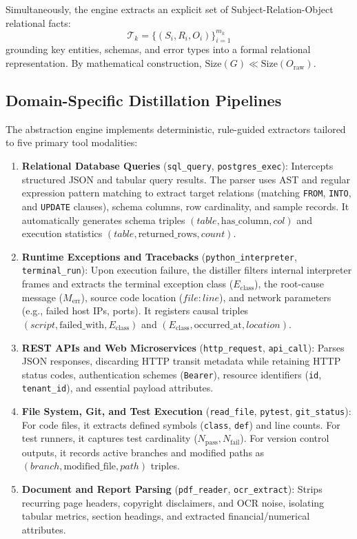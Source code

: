 \documentclass[lettersize,journal]{IEEEtran}
\begin{document}
Simultaneously, the engine extracts an explicit set of Subject-Relation-Object relational facts:
\begin{equation}
\label{eq:triples}
\mathcal{T}_k = \{(S_i, R_i, O_i)\}_{i=1}^{m_k}
\end{equation}
grounding key entities, schemas, and error types into a formal relational representation. By mathematical construction, $\text{Size}(G) \ll \text{Size}(O_{\text{raw}})$.

\subsection{Domain-Specific Distillation Pipelines}

The abstraction engine implements deterministic, rule-guided extractors tailored to five primary tool modalities:

\begin{enumerate}
    \item \textbf{Relational Database Queries} (\texttt{sql\_query}, \texttt{postgres\_exec}): Intercepts structured JSON and tabular query results. The parser uses AST and regular expression pattern matching to extract target relations (matching \texttt{FROM}, \texttt{INTO}, and \texttt{UPDATE} clauses), schema columns, row cardinality, and sample records. It automatically generates schema triples $(table, \text{has\_column}, col)$ and execution statistics $(table, \text{returned\_rows}, count)$.
    \item \textbf{Runtime Exceptions and Tracebacks} (\texttt{python\_interpreter}, \texttt{terminal\_run}): Upon execution failure, the distiller filters internal interpreter frames and extracts the terminal exception class ($E_{\text{class}}$), the root-cause message ($M_{\text{err}}$), source code location ($file:line$), and network parameters (e.g., failed host IPs, ports). It registers causal triples $(script, \text{failed\_with}, E_{\text{class}})$ and $(E_{\text{class}}, \text{occurred\_at}, location)$.
    \item \textbf{REST APIs and Web Microservices} (\texttt{http\_request}, \texttt{api\_call}): Parses JSON responses, discarding HTTP transit metadata while retaining HTTP status codes, authentication schemes (\texttt{Bearer}), resource identifiers (\texttt{id}, \texttt{tenant\_id}), and essential payload attributes.
    \item \textbf{File System, Git, and Test Execution} (\texttt{read\_file}, \texttt{pytest}, \texttt{git\_status}): For code files, it extracts defined symbols (\texttt{class}, \texttt{def}) and line counts. For test runners, it captures test cardinality ($N_{\text{pass}}, N_{\text{fail}}$). For version control outputs, it records active branches and modified paths as $(branch, \text{modified\_file}, path)$ triples.
    \item \textbf{Document and Report Parsing} (\texttt{pdf\_reader}, \texttt{ocr\_extract}): Strips recurring page headers, copyright disclaimers, and OCR noise, isolating tabular metrics, section headings, and extracted financial/numerical attributes.
\end{enumerate}
\end{document}
